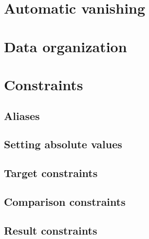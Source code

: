 \section{Automatic vanishing}                                                \label{alu: mod: automatic vanishing}   
\section{Data organization}                                                  \label{alu: mod: orga}                  
\section{Constraints}                                                        \label{alu: mod: constraints}           
\subsection{Aliases}                                                         \label{alu: mod: aliases}               
\subsection{Setting absolute values}                                         \label{alu: mod: absolute values}       
\subsection{Target constraints}                                              \label{alu: mod: target}                
\subsection{Comparison constraints}                                          \label{alu: mod: comparisons}              
\subsection{Result constraints}                                              \label{alu: mod: result}                
